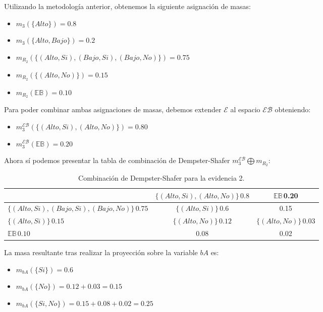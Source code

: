 \documentclass[11pt,a4paper]{article}
\begin{document}
Utilizando la metodología anterior, obtenemos la siguiente asignación de masas:
\begin{itemize}[leftmargin=2em, topsep=1ex]
    \item $m_{3}(\{Alto\}) = 0.8$
    \item $m_{3}(\{Alto, Bajo\}) = 0.2$
    \item $m_{R_2}(\{(Alto, Si), (Bajo, Si), (Bajo, No)\}) = 0.75$
    \item $m_{R_2}(\{(Alto, No)\}) = 0.15$
    \item $m_{R_2}(\mathbb{EB}) = 0.10$
\end{itemize}

Para poder combinar ambas asignaciones de masas, debemos extender $\mathcal{E}$ al espacio $\mathcal{EB}$ obteniendo:
\begin{itemize}[leftmargin=2em, topsep=1ex]
    \item $m_{3}^{\mathcal{EB}}(\{(Alto, Si), (Alto, No)\}) = 0.80$
    \item $m_{3}^{\mathcal{EB}}(\mathbb{EB}) = 0.20$
\end{itemize}

Ahora sí podemos presentar la tabla de combinación de Dempster-Shafer $m_{3}^{\mathcal{EB}}\bigoplus m_{R_2}$:
\begin{table}[H]
    \centering
    \begin{tabular}{l|c|c}
         & $\{(Alto, Si), (Alto, No)\}\, 0.8$ & $\mathbb{EB}$\,0.20 \\
        \hline
        $\{(Alto,Si), (Bajo, Si), (Bajo, No)\}\,0.75$ & $\{(Alto, Si)\}\,0.6$ & 0.15 \\
        \hline
        $\{(Alto,Si)\}\,0.15$ & $\{(Alto, No)\}\,0.12$ & $\{(Alto, No)\}\,0.03$ \\
        \hline
        $\mathbb{EB}\,0.10$ & 0.08 & 0.02 \\
    \end{tabular}
    \caption{Combinación de Dempster-Shafer para la evidencia 2.}
    \label{tab:ds_proyecto2}
\end{table}

La masa resultante tras realizar la proyección sobre la variable $bA$ es:
\begin{itemize}
    \item $m_{bA}(\{Si\}) = 0.6$
    \item $m_{bA}(\{No\}) = 0.12 + 0.03 = 0.15$
    \item $m_{bA}(\{Si, No\}) = 0.15 + 0.08 + 0.02 = 0.25$
\end{itemize}
\end{document}
